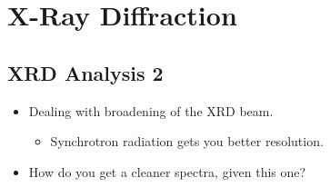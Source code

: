 \documentclass[../notes.tex]{subfiles}
\begin{document}
\chapter{X-Ray Diffraction}
\section{XRD Analysis 2}
\begin{itemize}
    \item {}Dealing with broadening of the XRD beam.
    \begin{itemize}
        \item Synchrotron radiation gets you better resolution.
    \end{itemize}
    \item How do you get a cleaner spectra, given this one?
    \begin{figure}[h!]
        \centering
\end{figure}
\end{itemize}
\end{document}
